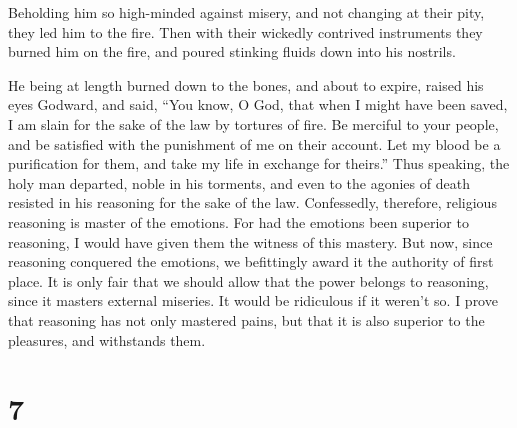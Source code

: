  Beholding him so high-minded against misery, and not
changing at their pity, they led him to the fire.  Then
with their wickedly contrived instruments they burned him on the fire,
and poured stinking fluids down into his nostrils.

 He being at length burned down to the bones, and about
to expire, raised his eyes Godward, and said,  ``You
know, O God, that when I might have been saved, I am slain for the sake
of the law by tortures of fire.  Be merciful to your
people, and be satisfied with the punishment of me on their account.
 Let my blood be a purification for them, and take my
life in exchange for theirs.''  Thus speaking, the holy
man departed, noble in his torments, and even to the agonies of death
resisted in his reasoning for the sake of the law. 
Confessedly, therefore, religious reasoning is master of the emotions.
 For had the emotions been superior to reasoning, I would
have given them the witness of this mastery.  But now,
since reasoning conquered the emotions, we befittingly award it the
authority of first place.  It is only fair that we should
allow that the power belongs to reasoning, since it masters external
miseries.  It would be ridiculous if it weren't so. I
prove that reasoning has not only mastered pains, but that it is also
superior to the pleasures, and withstands them.

\hypertarget{section-6}{%
\section{7}\label{section-6}}

